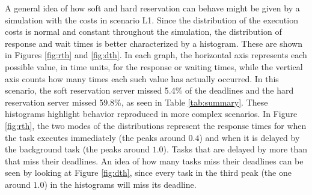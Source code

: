 \documentclass[times, 10pt,twocolumn]{article}
\begin{document}
A general idea of how soft and hard reservation can behave might be
given by a simulation with the costs in scenario L1. Since the
distribution of the execution costs is normal and constant throughout
the simulation, the distribution of response and wait times is better
characterized by a histogram. These are shown in Figures \ref{fig:rth}
and \ref{fig:dth}. In each graph, the horizontal axis represents each
possible value, in time units, for the response or waiting times,
while the vertical axis counts how many times each such value has
actually occurred. In this scenario, the soft reservation server
missed 5.4\% of the deadlines and the hard reservation server missed
59.8\%, as seen in Table \ref{tab:summary}. These histograms highlight
behavior reproduced in more complex scenarios. In Figure
\ref{fig:rth}, the two modes of the distributions represent the
response times for when the task executes immediately (the peaks
around $0.4$) and when it is delayed by the background task (the peaks
around $1.0$). Tasks that are delayed by more than that miss their
deadlines. An idea of how many tasks miss their deadlines can be seen
by looking at Figure \ref{fig:dth}, since every task in the third peak
(the one around $1.0$) in the histograms will miss its deadline.
\end{document}
